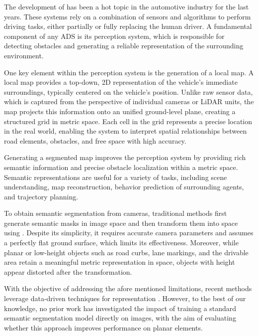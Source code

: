 The development of  has been a hot topic in the automotive industry for the last years. These systems rely on a combination of sensors and algorithms to perform driving tasks, either partially or fully replacing the human driver. A fundamental component of any ADS is its perception system,  which is responsible for detecting obstacles and generating a reliable representation of the surrounding environment.

One key element within the perception system is the generation of a local  map. A local  map provides a top-down, 2D representation of the vehicle's immediate surroundings, typically centered on the vehicle's position. Unlike raw sensor data, which is captured from the perspective of individual cameras or LiDAR units, the  map projects this information onto an unified ground-level plane, creating a structured grid in metric space. Each cell in the grid represents a precise location in the real world, enabling the system to interpret spatial relationships between road elements, obstacles, and free space with high accuracy.

Generating a segmented  map improves the perception system by providing rich semantic information and precise obstacle localization within a metric space. Semantic  representations are useful for a variety of tasks, including scene understanding, map reconstruction, behavior prediction of surrounding agents, and trajectory planning.

To obtain  semantic segmentation from cameras, traditional methods first generate semantic masks in image space and then transform them into  space using . Despite its simplicity, it requires accurate camera parameters and assumes a perfectly flat ground surface, which limits its effectiveness. Moreover, while planar or low-height objects such as road curbs, lane markings, and the drivable area retain a meaningful metric representation in  space, objects with height appear distorted after the transformation.

With the objective of addressing the afore mentioned limitations, recent methods leverage data-driven techniques for  representation \cite{view_parsing_network} \cite{lift_splat_shoot} \cite{m2bev}. However, to the best of our knowledge, no prior work has investigated the impact of training a standard semantic segmentation model directly on  images, with the aim of evaluating whether this approach improves performance on planar elements.

